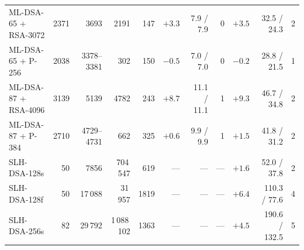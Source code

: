 \documentclass[conference,a4paper]{IEEEtran}
\newcommand{\newtext}[1]{{\color{blue}#1}}
\begin{document}
{\begin{table}[!tb]
\begin{tabular}{@{}lrrrrrrrrrr@{}}
ML-DSA-65 + RSA-3072 & 2371 & 3693 & 2191 & 147 & \newtext{$+3.3$} & 7.9 / 7.9 & 0 & \newtext{$+3.5$} & 32.5 / 24.3 & 2 \\
ML-DSA-65 + P-256 & 2038 & 3378--3381 & 302 & 150 & \newtext{$-0.5$} & 7.0 / 7.0 & 0 & \newtext{$-0.2$} & 28.8 / 21.5 & \newtext{1} \\
ML-DSA-87 + RSA-4096 & 3139 & 5139 & 4782 & 243 & \newtext{$+8.7$} & 11.1 / 11.1 & 1 & \newtext{$+9.3$} & 46.7 / 34.8 & 2 \\
ML-DSA-87 + P-384 & 2710 & 4729--4731 & 662 & 325 & \newtext{$+0.6$} & 9.9 / 9.9 & 1 & \newtext{$+1.5$} & 41.8 / 31.2 & 2 \\
SLH-DSA-128s & 50 & 7856 & 704\,547 & 619 & --- & --- & --- & \newtext{$+1.6$} & 52.0 / 37.8 & 2 \\
SLH-DSA-128f & 50 & 17\,088 & 31\,957 & 1819 & --- & --- & --- & \newtext{$+6.4$} & 110.3 / 77.6 & 4 \\
SLH-DSA-256s & 82 & 29\,792 & 1\,088\,102 & 1363 & --- & --- & --- & \newtext{$+4.5$} & 190.6 / 132.5 & 5 \\
\bottomrule
\end{tabular}
\end{table}

}
\end{document}
